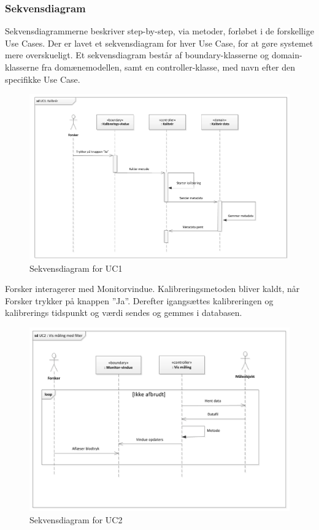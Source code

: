 \subsubsection{Sekvensdiagram}
Sekvensdiagrammerne beskriver step-by-step, via metoder, forløbet i de forskellige Use Cases. Der er lavet et sekvensdiagram for hver Use Case, for at gøre systemet mere overskueligt. Et sekvensdiagram består af boundary-klasserne og domain-klasserne fra domænemodellen, samt en controller-klasse, med navn efter den specifikke Use Case.

\begin{figure}[H]
	\centering
	\includegraphics[width=1\textwidth]{Figurer/Snip20151104_31}
	\caption{Sekvensdiagram for UC1}
\end{figure}

Forsker interagerer med Monitorvindue. Kalibreringsmetoden bliver kaldt, når Forsker trykker på knappen ”Ja”. Derefter igangsættes kalibreringen og kalibrerings tidspunkt og værdi sendes og gemmes i databasen. 

\begin{figure}[H]
	\centering
	\includegraphics[width=1\textwidth]{Figurer/Snip20151104_32}
	\caption{Sekvensdiagram for UC2}
\end{figure}

